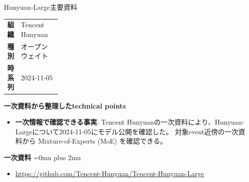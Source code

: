 \begin{technicalnote}{Hunyuan-Large}{主要資料}
\begingroup
\begin{tabularx}{\linewidth}{@{}>{\bfseries}p{0.22\linewidth}X@{}}
組織 & Tencent Hunyuan \\
種別 & オープンウェイト \\
時系列 & 2024-11-05 \\
\end{tabularx}
\smallskip
{\bfseries 一次資料から整理したtechnical points}
\begin{itemize}[leftmargin=1.5em,itemsep=0.35em]
\item \textbf{一次情報で確認できる事実}: Tencent Hunyuanの一次資料により、Hunyuan-Largeについて2024-11-05にモデル公開を確認した。 対象event近傍の一次資料から Mixture-of-Experts (MoE) を確認できる。
\end{itemize}
\begin{minipage}{\linewidth}
\begin{samepage}
{\bfseries 一次資料}
\begingroup\sloppy
\Urlmuskip=0mu plus 2mu\relax
\begin{itemize}[leftmargin=1.5em,itemsep=0.25em]
\item {\scriptsize\url{https://github.com/Tencent-Hunyuan/Tencent-Hunyuan-Large}}
\end{itemize}
\endgroup
\end{samepage}
\end{minipage}
\endgroup
\end{technicalnote}
\medskip


